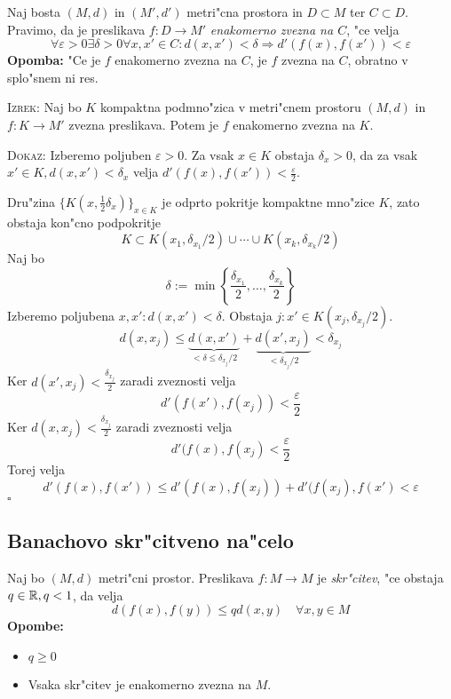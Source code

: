  Naj bosta $(M, d)$ in $(M', d')$ metri"cna prostora in $D \subset M$ ter $C \subset D$. Pravimo, da je preslikava $f: D \to M'$ \emph{enakomerno zvezna na $C$}, "ce velja
\begin{equation*}
\forall \varepsilon > 0 \exists \delta > 0 \forall x, x' \in C: d(x, x') < \delta \Rightarrow d'(f(x), f(x')) < \varepsilon
\end{equation*}
\textbf{Opomba:} "Ce je $f$ enakomerno zvezna na $C$, je $f$ zvezna na $C$, obratno v splo"snem ni res.

\textsc{Izrek:} Naj bo $K$ kompaktna podmno"zica v metri"cnem prostoru $(M, d)$ in $f: K \to M'$ zvezna preslikava. Potem je $f$ enakomerno zvezna na $K$.

\textsc{Dokaz:} Izberemo poljuben $\varepsilon > 0$. Za vsak $x \in K$ obstaja $\delta_x > 0$, da za vsak $x' \in K, d(x, x') < \delta_x$ velja $d'(f(x), f(x')) < \frac{\varepsilon}{2}$.

Dru"zina $\{ K(x, \frac{1}{2} \delta_x) \}_{x \in K}$ je odprto pokritje kompaktne mno"zice $K$, zato obstaja kon"cno podpokritje
\begin{equation*}
K \subset K(x_1, \delta_{x_1} / 2) \cup \cdots \cup K(x_k, \delta_{x_k} / 2)
\end{equation*}
Naj bo
\begin{equation*}
\delta := \min \left\{ \dfrac{\delta_{x_1}}{2}, \ldots, \dfrac{\delta_{x_k}}{2} \right\}
\end{equation*}
Izberemo poljubena $x, x': d(x, x') < \delta$. Obstaja $j: x' \in K(x_j, \delta_{x_j} / 2)$.
\begin{equation*}
d(x, x_j) \leq \underbrace{d(x, x')}_{< \delta \leq \delta_{x_j} / 2} + \underbrace{d(x', x_j)}_{< \delta_{x_j} / 2} < \delta_{x_j}
\end{equation*}
Ker $d(x', x_j) < \frac{\delta_{x_j}}{2}$ zaradi zveznosti velja
\begin{equation*}
d'(f(x'), f(x_j)) < \dfrac{\varepsilon}{2}
\end{equation*}
Ker $d(x, x_j) < \frac{\delta_{x_j}}{2}$ zaradi zveznosti velja
\begin{equation*}
d'(f(x), f(x_j) < \dfrac{\varepsilon}{2}
\end{equation*}
Torej velja
\begin{equation*}
d'(f(x), f(x')) \leq d'(f(x), f(x_j)) + d'(f(x_j), f(x') < \varepsilon
\end{equation*}
\hfill $\square$

\subsection{Banachovo skr"citveno na"celo}
 Naj bo $(M, d)$ metri"cni prostor. Preslikava $f: M \to M$ je \emph{skr"citev}, "ce obstaja $q \in \mathbb{R}, q < 1$, da velja
\begin{equation*}
d(f(x), f(y)) \leq q d(x, y) \quad \forall x, y \in M
\end{equation*}
\textbf{Opombe:}
\begin{itemize}
    \item $q \geq 0$
    \item Vsaka skr"citev je enakomerno zvezna na $M$.
\end{itemize}

